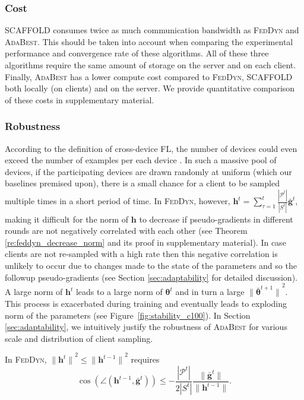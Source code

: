 \documentclass[runningheads]{llncs}
\def\figref#1{Figure~\ref{#1}}
\def\vtheta{{\bm{\theta}}}
\def\vg{{\bm{g}}}
\def\vh{{\bm{h}}}
\def\gP{{\mathcal{P}}}
\newcommand*\mean[1]{\bar{#1}}
\newcommand{\scaffold}{\textsc{SCAFFOLD}\xspace}
\newcommand{\feddyn}{\textsc{FedDyn}\xspace}
\newcommand{\ours}{\textsc{AdaBest}\xspace}
\begin{document}
\subsubsection{Cost}
\scaffold consumes twice as much communication bandwidth as \feddyn and \ours. This should be taken into account when comparing the experimental performance and convergence rate of these algorithms. All of these three algorithms require the same amount of storage on the server and on each client. Finally, \ours has a lower compute cost compared to \feddyn, \scaffold both locally (on clients) and on the server. We provide quantitative comparison of these costs in supplementary material.

\subsubsection{Robustness}
According to the definition of cross-device FL, the number of devices could even exceed the number of examples per each device \cite{mcmahan2017communication}. In such a massive pool of devices, if the participating devices are drawn randomly at uniform (which our baselines premised upon), there is a small chance for a client to be sampled multiple times in a short period of time. In \feddyn, however, $\vh^t=\sum_{\tau=1}^t\frac{|\gP^t|}{|S^t|}\mean{\vg}^t$, making it difficult for the norm of $\vh$ to decrease if pseudo-gradients in different rounds are not negatively correlated with each other (see Theorem \ref{re:feddyn_decrease_norm} and its proof in supplementary material). In case clients are not re-sampled with a high rate then this negative correlation is unlikely to occur due to changes made to the state of the parameters and so the followup pseudo-gradients (see Section \ref{sec:adaptability} for detailed discussion). A large norm of $\vh^t$ leads to a large norm of $\vtheta^{t}$ and in turn a large ${\|\mean{\vtheta}^{t+1}\|}^2$. This process is exacerbated during training and eventually leads to exploding norm of the parameters (see \figref{fig:stability_c100}). 
In Section \ref{sec:adaptability}, we intuitively justify the robustness of \ours for various scale and distribution of client sampling.

\begin{theorem}
\label{re:feddyn_decrease_norm}
In \feddyn, ${\|\vh^t\|}^2 \leq {\|\vh^{t-1}\|}^2$ requires
\begin{equation}
\cos( \angle (\vh^{t-1}, \mean{\vg}^{t})) \leq - \frac{|\gP^t|}{2|S^t|} \frac{\|\mean{\vg}^{t}\|}{\|{\vh}^{t-1}\|}.
\end{equation}

\end{theorem}
\end{document}
